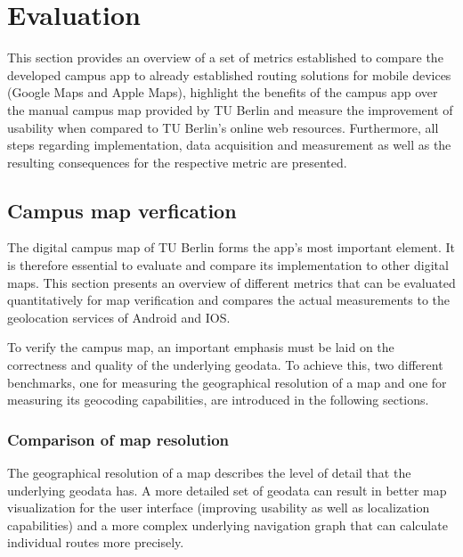 \chapter{Evaluation}
\label{cha:evaluation}
This section provides an overview of a set of metrics established to compare the developed campus app to already established routing solutions for mobile devices (Google Maps and Apple Maps), highlight the benefits of the campus app over the manual campus map provided by TU Berlin and measure the improvement of usability when compared to TU Berlin's online web resources. Furthermore, all steps regarding implementation, data acquisition and measurement as well as the resulting consequences for the respective metric are presented.

\section{Campus map verfication}
The digital campus map of TU Berlin forms the app's most important element. It is therefore essential to evaluate and compare its implementation to other digital maps. This section presents an overview of different metrics that can be evaluated quantitatively for map verification and compares the actual measurements to the geolocation services of Android and IOS.

To verify the campus map, an important emphasis must be laid on the correctness and quality of the underlying geodata. To achieve this, two different benchmarks, one for measuring the geographical resolution of a map and one for measuring its geocoding capabilities, are introduced in the following sections.


\subsection{Comparison of map resolution}
The geographical resolution of a map describes the level of detail that the underlying geodata has. A more detailed set of geodata can result in better map visualization for the user interface (improving usability as well as localization capabilities) and a more complex underlying navigation graph that can calculate individual routes more precisely.


